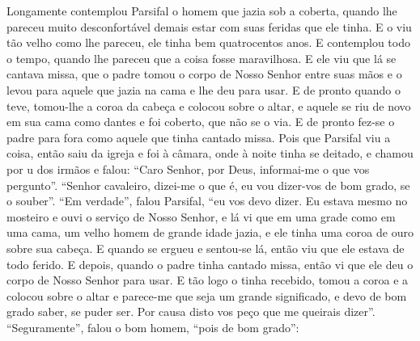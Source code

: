 Longamente contemplou Parsifal o homem que jazia sob a coberta, quando lhe
pareceu muito desconfortável demais estar com suas feridas que ele tinha. E o
viu tão velho como lhe pareceu, ele tinha bem quatrocentos anos. E
contemplou todo o tempo, quando lhe pareceu que a coisa fosse maravilhosa. E
ele viu que lá se cantava missa, que o padre tomou o corpo de Nosso Senhor
entre suas mãos e o levou para aquele que jazia na cama e lhe deu para usar. E
de pronto quando o teve, tomou-lhe a coroa da cabeça e colocou sobre o altar, e
aquele se riu de novo em sua cama como dantes e foi coberto, que não se o via.
E de pronto fez-se o padre para fora como aquele que tinha cantado missa. 
Pois que Parsifal viu a coisa, então saiu da igreja e foi à câmara, onde
à noite tinha se deitado, e chamou por u dos irmãos e falou: “Caro Senhor, por
Deus, informai-me o que vos pergunto”. “Senhor cavaleiro, dizei-me o que é, eu
vou dizer-vos de bom grado, se o souber”. “Em verdade”, falou Parsifal, “eu
vos devo dizer. Eu estava mesmo no mosteiro e ouvi o serviço de Nosso Senhor, e
lá vi que em uma grade como em uma cama, um velho homem de grande idade jazia,
e ele tinha uma coroa de ouro sobre sua cabeça. E quando se ergueu e sentou-se
lá, então viu que ele estava de todo ferido. E depois, quando o padre tinha
cantado missa, então vi que ele deu o corpo de Nosso Senhor para usar. E tão
logo o tinha recebido, tomou a coroa e a colocou sobre o altar e parece-me que
seja um grande significado, e devo de bom grado saber, se puder ser. Por causa
disto vos peço que me queirais dizer”. “Seguramente”, falou o bom homem, “pois
de bom grado”:

